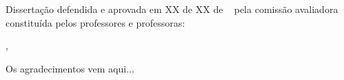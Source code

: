 \documentclass[
	12pt,				%
	openright,			%
	twoside,			%
	a4paper,			%
	english,			%
	brazil				%
	]{abntex2}
\begin{document}

%
% 
%
\begin{folhadeaprovacao}
%
   Dissertação defendida e aprovada em XX de XX de \the\year~ pela comissão avaliadora constituída pelos professores e professoras:
   \vspace*{\fill}
   \vspace*{\fill}
   \vspace*{\fill}
   \vspace*{\fill}

   \begin{center}
    \vspace*{0.5cm}
    {\large\imprimirlocal}, {\large\imprimirdata}
    \vspace*{1cm}
  \end{center}

\end{folhadeaprovacao}


\begin{agradecimentos}
\noindent Os agradecimentos vem aqui...

\end{agradecimentos}
\end{document}
